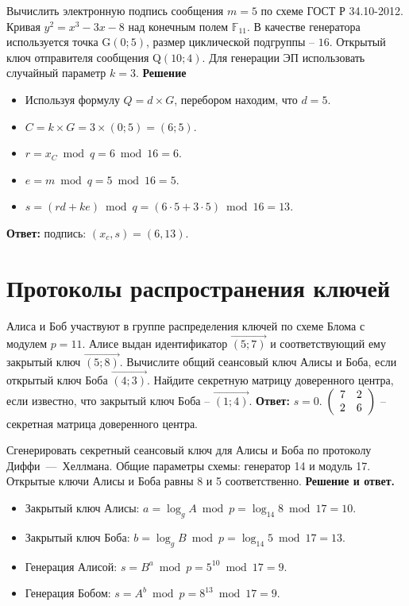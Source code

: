 \tasknumber Вычислить электронную подпись сообщения $m=5$ по схеме ГОСТ Р 34.10-2012. Кривая $y^2 = x^3 - 3 x - 8$ над конечным полем $\mathbb{F}_{11}$. В качестве генератора используется точка G$\left(0; 5\right)$, размер циклической подгруппы -- $16$. Открытый ключ отправителя сообщения Q$\left(10; 4\right)$. Для генерации ЭП использовать случайный параметр $k=3$.
\medbreak
\textbf{Решение}
\begin{itemize}
\item Используя формулу $Q = d \times G$, перебором находим, что $d = 5$.
\item $C = k \times G = 3 \times \left(0; 5\right) = \left(6; 5\right)$.
\item $r = x_C \bmod q = 6 \bmod 16 = 6$.
\item $e = m \bmod q = 5 \bmod 16 = 5$.
\item $s = ( r d + k e ) \bmod q = ( 6 \cdot 5 + 3 \cdot 5 ) \bmod 16 = 13$.
\end{itemize}
\medbreak
\textbf{Ответ:} подпись: $(x_c, s) = (6, 13)$.
\bigbreak

\section{Протоколы распространения ключей}
\tasksection

\tasknumber Алиса и Боб участвуют в группе распределения ключей по схеме Блома с модулем $p = 11$. Алисе выдан идентификатор $\overrightarrow{(5; 7)}$ и соответствующий ему закрытый ключ $\overrightarrow{(5; 8)}$. Вычислите общий сеансовый ключ Алисы и Боба, если открытый ключ Боба $\overrightarrow{(4; 3)}$. Найдите секретную матрицу доверенного центра, если известно, что закрытый ключ Боба -- $\overrightarrow{(1; 4)}$.
\medbreak
\textbf{Ответ:} $s = 0$. $\left( {\begin{array}{*{20}c}
   7 & 2  \\
   2 & 6  \\
\end{array}} \right)$ -- секретная матрица доверенного центра.
\bigbreak

\tasknumber Сгенерировать секретный сеансовый ключ для Алисы и Боба по протоколу Диффи~---~Хеллмана. Общие параметры схемы: генератор 14 и модуль 17. Открытые ключи Алисы и Боба равны 8 и 5 соответственно.
\medbreak
\textbf{Решение и ответ.}
\begin{itemize}
\item Закрытый ключ Алисы: $a = \log_{g} A \bmod p = \log_{14} 8 \bmod 17 = 10$.
\item Закрытый ключ Боба: $b = \log_{g} B \bmod p = \log_{14} 5 \bmod 17 = 13$.
\item Генерация Алисой: $s = {B}^{a} \bmod p  = {5}^{10} \bmod 17 = 9$.
\item Генерация Бобом: $s = {A}^{b} \bmod p  = {8}^{13} \bmod 17 = 9$.
\end{itemize}

